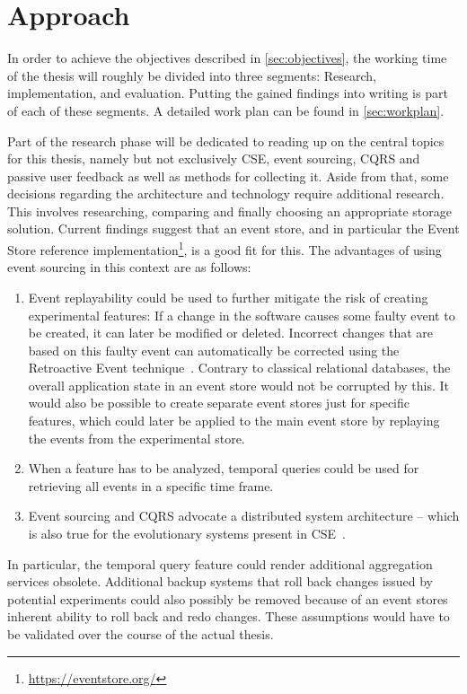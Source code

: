 %
\chapter{Approach}
\label{sec:approach}

In order to achieve the objectives described in \cref{sec:objectives}, the working time of the thesis will roughly be divided into three segments: Research, implementation, and evaluation.
Putting the gained findings into writing is part of each of these segments.
A detailed work plan can be found in \cref{sec:workplan}.

Part of the research phase will be dedicated to reading up on the central topics for this thesis, namely but not exclusively \acf{CSE}, event sourcing, \acf{CQRS} and passive user feedback as well as methods for collecting it.
Aside from that, some decisions regarding the architecture and technology require additional research.
This involves researching, comparing and finally choosing an appropriate storage solution.
Current findings suggest that an event store, and in particular the Event Store reference implementation\footnote{\url{https://eventstore.org/}}, is a good fit for this.
The advantages of using event sourcing in this context are as follows:

\begin{enumerate}
\item Event replayability could be used to further mitigate the risk of creating experimental features: If a change in the software causes some faulty event to be created, it can later be modified or deleted.
Incorrect changes that are based on this faulty event can automatically be corrected using the Retroactive Event technique~\cite{WEB:Fowler:2005-3}.
Contrary to classical relational databases, the overall application state in an event store would not be corrupted by this.
It would also be possible to create separate event stores just for specific features, which could later be applied to the main event store by replaying the events from the experimental store.
\item When a feature has to be analyzed, temporal queries could be used for retrieving all events in a specific time frame.
\item Event sourcing and \ac{CQRS} advocate a distributed system architecture -- which is also true for the evolutionary systems present in \ac{CSE}~\cite{ford2017building}.
\end{enumerate}

In particular, the temporal query feature could render additional aggregation services obsolete.
Additional backup systems that roll back changes issued by potential experiments could also possibly be removed because of an event stores inherent ability to roll back and redo changes.
These assumptions would have to be validated over the course of the actual thesis.

